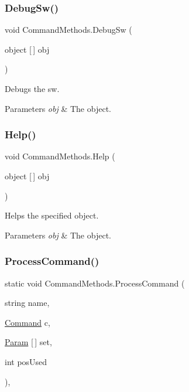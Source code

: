 \subsubsection{\texorpdfstring{Debug\+Sw()}{DebugSw()}}
{\footnotesize\ttfamily void Command\+Methods.\+Debug\+Sw (\begin{DoxyParamCaption}\item[{object \mbox{[}$\,$\mbox{]}}]{obj }\end{DoxyParamCaption})\hspace{0.3cm}{\ttfamily [inline]}}



Debugs the sw. 


\begin{DoxyParams}{Parameters}
{\em obj} & The object.\\
\hline
\end{DoxyParams}
\mbox{\label{class_command_methods_a28f74ac49ae31b888b9917c73982bda2}} 
\subsubsection{\texorpdfstring{Help()}{Help()}}
{\footnotesize\ttfamily void Command\+Methods.\+Help (\begin{DoxyParamCaption}\item[{object \mbox{[}$\,$\mbox{]}}]{obj }\end{DoxyParamCaption})\hspace{0.3cm}{\ttfamily [inline]}}



Helps the specified object. 


\begin{DoxyParams}{Parameters}
{\em obj} & The object.\\
\hline
\end{DoxyParams}
\mbox{\label{class_command_methods_a320048e79589448c4948871452ca4cdb}} 
\subsubsection{\texorpdfstring{Process\+Command()}{ProcessCommand()}}
{\footnotesize\ttfamily static void Command\+Methods.\+Process\+Command (\begin{DoxyParamCaption}\item[{string}]{name,  }\item[{\hyperlink{class_lerp2_a_p_i_1_1_game_1_1_command}{Command}}]{c,  }\item[{\hyperlink{class_lerp2_a_p_i_1_1_game_1_1_param}{Param} \mbox{[}$\,$\mbox{]}}]{set,  }\item[{int}]{pos\+Used }\end{DoxyParamCaption})\hspace{0.3cm}{\ttfamily [inline]}, {\ttfamily [static]}}



